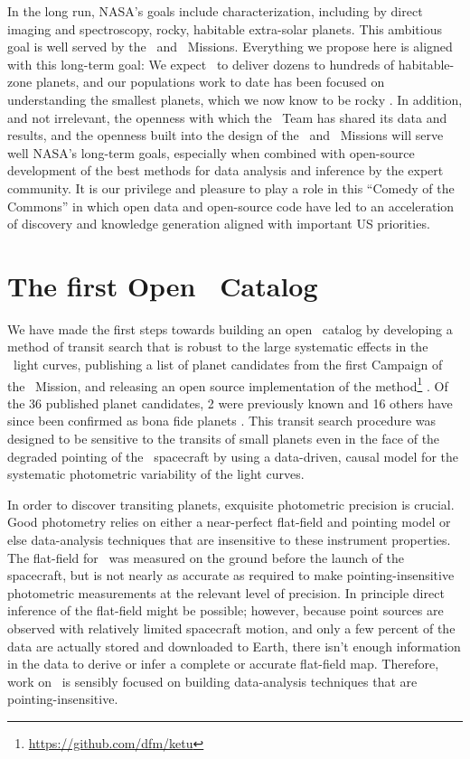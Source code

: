 \documentclass[12pt,preprint]{aastex}
\begin{document}
In the long run, NASA's goals include characterization, including by
direct imaging and spectroscopy, rocky, habitable extra-solar planets.
This ambitious goal is well served by the \kepler\ and \kt\ Missions.
Everything we propose here is aligned with this long-term goal:
We expect \kt\ to deliver dozens to hundreds of habitable-zone
planets, and our populations work to date has been focused on
understanding the smallest planets, which we now know to be rocky
\citep{Rogers:2015}.
In addition, and not irrelevant, the openness with which the
\kepler\ Team has shared its data and results, and the openness built
into the design of the \kt\ and \tess\ Missions will serve well NASA's
long-term goals, especially when combined with open-source development
of the best methods for data analysis and inference by the expert
community.
It is our privilege and pleasure to play a role in this ``Comedy of
the Commons'' in which open data and open-source code have led to an
acceleration of discovery and knowledge generation aligned with
important US priorities.

\section{The first Open \ketu\ Catalog}

We have made the first steps towards building an open \ketu\ catalog by
developing a method of transit search that is robust to the large systematic
effects in the \ketu\ light curves, publishing a list of planet candidates
from the first Campaign of the \ketu\ Mission, and releasing an open source
implementation of the method\footnote{\url{https://github.com/dfm/ketu}}
\citep{Foreman-Mackey:2015}.
Of the 36 published planet candidates, 2 were previously known
\citep{Crossfield:2015} and 16 others have since been confirmed as bona fide
planets \citep{Armstrong:2015, Montet:2015}.
This transit search procedure was designed to be sensitive to the transits of
small planets even in the face of the degraded pointing of the \kepler\
spacecraft by using a data-driven, causal model for the systematic photometric
variability of the light curves.

In order to discover transiting planets, exquisite photometric precision is
crucial.
Good photometry relies on either a near-perfect flat-field
and pointing model or else data-analysis techniques that are
insensitive to these instrument properties.
The flat-field for \kepler\ was measured on the ground before the launch of
the spacecraft, but is not nearly as accurate as required to make
pointing-insensitive photometric measurements at the relevant level of
precision.
In principle direct inference of the flat-field might be possible;
however, because point sources are observed with relatively limited
spacecraft motion, and only a few percent of the data are actually stored and
downloaded to Earth, there isn't enough information in the data to derive or
infer a complete or accurate flat-field map.
Therefore, work on \KT\ is sensibly focused on building data-analysis
techniques that are pointing-insensitive.
\end{document}
